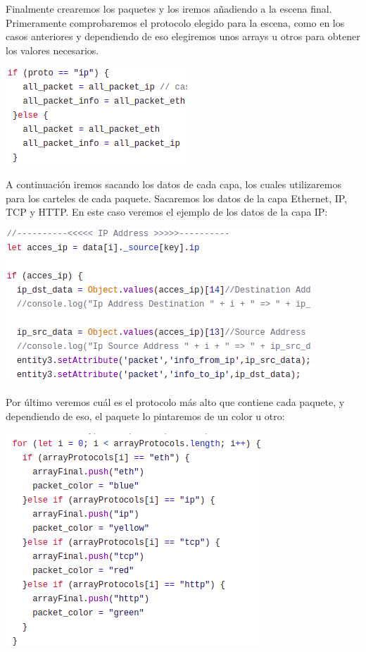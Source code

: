 \documentclass[a4paper, 12pt]{book}
\begin{document}
\newpage
Finalmente crearemos los paquetes y los iremos añadiendo a la escena final.
\newline
Primeramente comprobaremos el protocolo elegido para la escena, como en los casos anteriores y dependiendo de eso elegiremos unos arrays u otros para obtener los valores necesarios.

\begin{center}
    \includegraphics[scale=0.7]{img/ifPack_comp_netsim.png}
\end{center}

A continuación iremos sacando los datos de cada capa, los cuales utilizaremos para los carteles de cada paquete. Sacaremos los datos de la capa Ethernet, IP, TCP y HTTP. En este caso veremos el ejemplo de los datos de la capa IP:

\begin{center}
    \includegraphics[scale=0.7]{img/ipdatacartel_comp_netsim.png}
\end{center}

Por último veremos cuál es el protocolo más alto que contiene cada paquete, y dependiendo de eso, el paquete lo pintaremos de un color u otro:

\begin{center}
    \includegraphics[scale=0.7]{img/protoColorFInal_comp_netsim.png}
\end{center}
\end{document}
